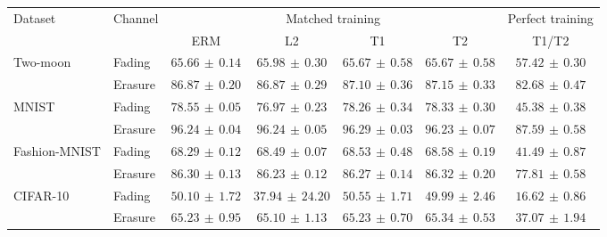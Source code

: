 \begin{tabular*}{\linewidth}{@{\extracolsep{\fill}}llccccc@{}}
\toprule
\multirow{2}{*}{Dataset} & \multirow{2}{*}{Channel} & \multicolumn{4}{c}{Matched training} & Perfect training \\
\cmidrule(lr){3-6}\cmidrule(l){7-7}
 & & ERM & L2 & T1 & T2 & T1/T2 \\
\midrule
\multirow{2}{*}{Two-moon} & Fading & $65.66\,\pm\,0.14$ & $\mathbf{65.98}\,\pm\,0.30$ & $65.67\,\pm\,0.58$ & $65.67\,\pm\,0.58$ & $57.42\,\pm\,0.30$ \\
 & Erasure & $86.87\,\pm\,0.20$ & $86.87\,\pm\,0.29$ & $87.10\,\pm\,0.36$ & $\mathbf{87.15}\,\pm\,0.33$ & $82.68\,\pm\,0.47$ \\
\midrule[0.25pt]
\multirow{2}{*}{MNIST} & Fading & $\mathbf{78.55}\,\pm\,0.05$ & $76.97\,\pm\,0.23$ & $78.26\,\pm\,0.34$ & $78.33\,\pm\,0.30$ & $45.38\,\pm\,0.38$ \\
 & Erasure & $96.24\,\pm\,0.04$ & $96.24\,\pm\,0.05$ & $\mathbf{96.29}\,\pm\,0.03$ & $96.23\,\pm\,0.07$ & $87.59\,\pm\,0.58$ \\
\midrule[0.25pt]
\multirow{2}{*}{Fashion-MNIST} & Fading & $68.29\,\pm\,0.12$ & $68.49\,\pm\,0.07$ & $68.53\,\pm\,0.48$ & $\mathbf{68.58}\,\pm\,0.19$ & $41.49\,\pm\,0.87$ \\
 & Erasure & $86.30\,\pm\,0.13$ & $86.23\,\pm\,0.12$ & $86.27\,\pm\,0.14$ & $\mathbf{86.32}\,\pm\,0.20$ & $77.81\,\pm\,0.58$ \\
\midrule[0.25pt]
\multirow{2}{*}{CIFAR-10} & Fading & $50.10\,\pm\,1.72$ & $37.94\,\pm\,24.20$ & $\mathbf{50.55}\,\pm\,1.71$ & $49.99\,\pm\,2.46$ & $16.62\,\pm\,0.86$ \\
 & Erasure & $65.23\,\pm\,0.95$ & $65.10\,\pm\,1.13$ & $65.23\,\pm\,0.70$ & $\mathbf{65.34}\,\pm\,0.53$ & $37.07\,\pm\,1.94$ \\
\bottomrule
\end{tabular*}
